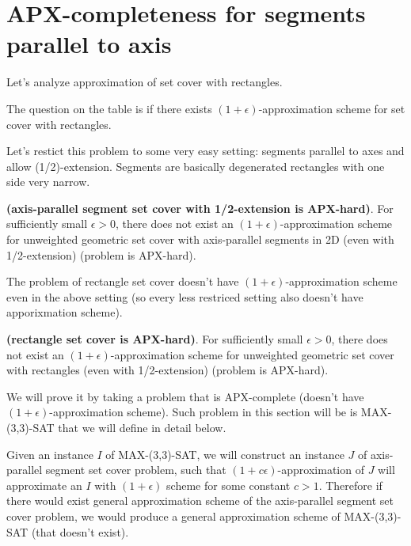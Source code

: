 \section{APX-completeness for segments parallel to axis}
\label{section:segment_apx}

Let's analyze approximation of set cover with rectangles.

The question on the table is
if there exists $(1+\epsilon)$-approximation scheme
for set cover with rectangles.

Let's restict this problem to some very easy setting:
segments parallel to axes and allow (1/2)-extension.
Segments are basically degenerated rectangles with one side very narrow.


\begin{tw}{
\label{segment_cover_apx_hard}
	\textbf{(axis-parallel segment set cover with 1/2-extension is APX-hard)}.	
	For sufficiently small $\epsilon > 0$,
	there does not exist an $(1+\epsilon)$-approximation scheme
	for unweighted geometric set cover
	with axis-parallel segments in 2D (even with 1/2-extension)
	(problem is APX-hard).
}\end{tw}

The problem of rectangle set cover doesn't have 
$(1+\epsilon)$-approximation scheme even in the above setting
(so every less restriced setting also doesn't have apporixmation scheme).

\begin{tw}{
	\textbf{(rectangle set cover is APX-hard)}.	
	For sufficiently small $\epsilon > 0$,
	there does not exist an $(1+\epsilon)$-approximation scheme
	for unweighted geometric set cover
	with rectangles (even with 1/2-extension)
	(problem is APX-hard).
}\end{tw}

We will prove it by taking a problem that is APX-complete
(doesn't have $(1+\epsilon)$-approximation scheme). Such problem 
in this section will be is
MAX-(3,3)-SAT that we will define in detail below.

Given an instance $I$ of MAX-(3,3)-SAT,
we will construct an instance $J$ of 
axis-parallel segment set cover problem,
such that $(1+c\epsilon)$-approximation of $J$ will approximate
an $I$ with $(1+\epsilon)$ scheme for some constant $c > 1$.
Therefore if there would exist general approximation scheme of
the axis-parallel segment set cover problem,
we would produce a general approximation scheme of MAX-(3,3)-SAT
(that doesn't exist).




